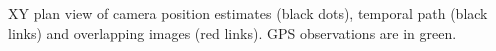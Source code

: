 XY plan view of camera position estimates (black dots), temporal path (black links) and overlapping images (red links). GPS observations are in green.
  